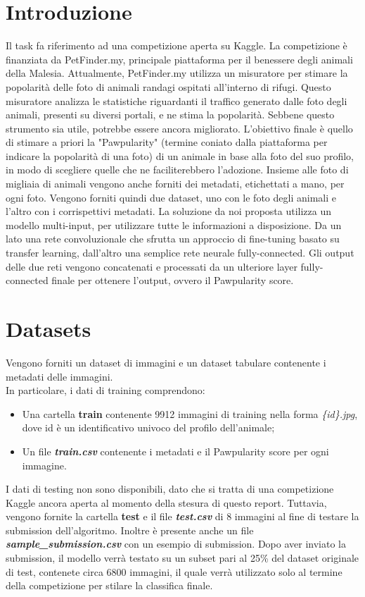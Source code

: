 \section{Introduzione}
    Il task fa riferimento ad una competizione aperta su Kaggle.
    La competizione è finanziata da PetFinder.my, principale piattaforma per il benessere degli animali della Malesia. Attualmente, PetFinder.my utilizza un misuratore per stimare la popolarità delle foto di animali randagi ospitati all'interno di rifugi. Questo misuratore analizza le statistiche riguardanti il traffico generato dalle foto degli animali, presenti su diversi portali, e ne stima la popolarità. Sebbene questo strumento sia utile, potrebbe essere ancora migliorato. L'obiettivo finale è quello di stimare a priori la "Pawpularity" (termine coniato dalla piattaforma per indicare la popolarità di una foto) di un animale in base alla foto del suo profilo, in modo di scegliere quelle che ne faciliterebbero l'adozione. Insieme alle foto di migliaia di animali vengono anche forniti dei metadati, etichettati a mano, per ogni foto. Vengono forniti quindi due dataset, uno con le foto degli animali e l'altro con i corrispettivi metadati.
    La soluzione da noi proposta utilizza un modello multi-input, per utilizzare tutte le informazioni a disposizione. Da un lato una rete convoluzionale che sfrutta un approccio di fine-tuning basato su transfer learning, dall'altro una semplice rete neurale fully-connected. Gli output delle due reti vengono concatenati e processati da un ulteriore layer fully-connected finale per ottenere l'output, ovvero il Pawpularity score.


\section{Datasets}
    Vengono forniti un dataset di immagini e un dataset tabulare contenente i metadati delle immagini.\\ In particolare, i dati di training comprendono:
    \begin{itemize}
        \item Una cartella \textbf{train} contenente 9912 immagini di training nella forma \textit{\{id\}.jpg}, dove id è un identificativo univoco del profilo dell'animale;
        \item Un file \textbf{\textit{train.csv}} contenente i metadati e il Pawpularity score per ogni immagine.
    \end{itemize}

    I dati di testing non sono disponibili, dato che si tratta di una competizione Kaggle ancora aperta al momento della stesura di questo report. Tuttavia, vengono fornite la cartella \textbf{test} e il file \textbf{\textit{test.csv}} di 8 immagini al fine di testare la submission dell'algoritmo.
    Inoltre è presente anche un file \textbf{\textit{sample\_submission.csv}} con un esempio di submission. Dopo aver inviato la submission, il modello verrà testato su un subset pari al 25\% del dataset originale di test, contenete circa 6800 immagini, il quale verrà utilizzato solo al termine della competizione per stilare la classifica finale.

